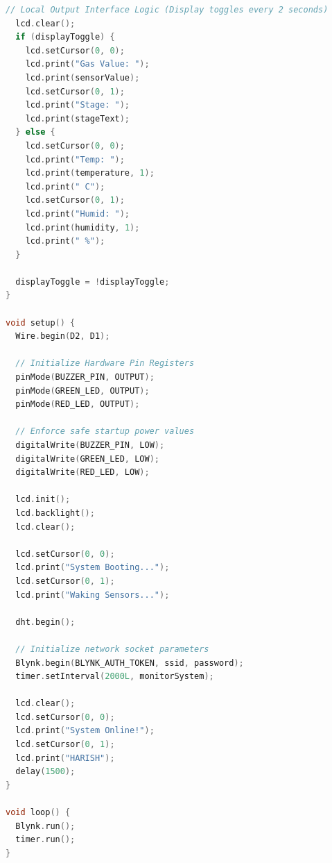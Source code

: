 \begin{lstlisting}[language=C, caption=ESP8266 Blynk firmware for food spoilage monitoring]
  // Local Output Interface Logic (Display toggles every 2 seconds)
  lcd.clear();
  if (displayToggle) {
    lcd.setCursor(0, 0);
    lcd.print("Gas Value: ");
    lcd.print(sensorValue);
    lcd.setCursor(0, 1);
    lcd.print("Stage: ");
    lcd.print(stageText);
  } else {
    lcd.setCursor(0, 0);
    lcd.print("Temp: ");
    lcd.print(temperature, 1);
    lcd.print(" C");
    lcd.setCursor(0, 1);
    lcd.print("Humid: ");
    lcd.print(humidity, 1);
    lcd.print(" %");
  }

  displayToggle = !displayToggle;
}

void setup() {
  Wire.begin(D2, D1);

  // Initialize Hardware Pin Registers
  pinMode(BUZZER_PIN, OUTPUT);
  pinMode(GREEN_LED, OUTPUT);
  pinMode(RED_LED, OUTPUT);

  // Enforce safe startup power values
  digitalWrite(BUZZER_PIN, LOW);
  digitalWrite(GREEN_LED, LOW);
  digitalWrite(RED_LED, LOW);

  lcd.init();
  lcd.backlight();
  lcd.clear();

  lcd.setCursor(0, 0);
  lcd.print("System Booting...");
  lcd.setCursor(0, 1);
  lcd.print("Waking Sensors...");

  dht.begin();

  // Initialize network socket parameters
  Blynk.begin(BLYNK_AUTH_TOKEN, ssid, password);
  timer.setInterval(2000L, monitorSystem);

  lcd.clear();
  lcd.setCursor(0, 0);
  lcd.print("System Online!");
  lcd.setCursor(0, 1);
  lcd.print("HARISH");
  delay(1500);
}

void loop() {
  Blynk.run();
  timer.run();
}
\end{lstlisting}

